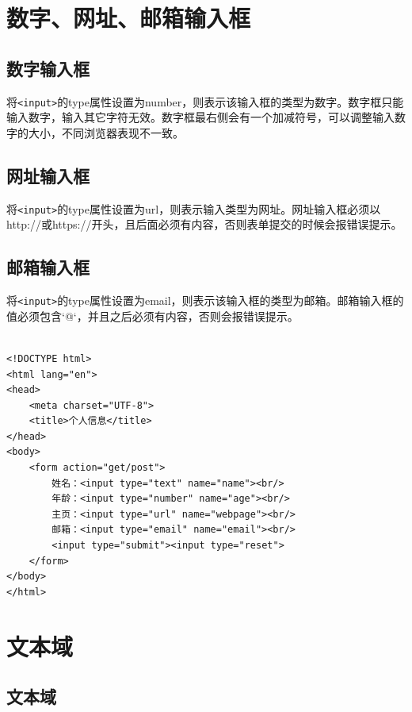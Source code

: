 \newpage

\section{数字、网址、邮箱输入框}

\subsection{数字输入框}

将\lstinline|<input>|的type属性设置为number，则表示该输入框的类型为数字。数字框只能输入数字，输入其它字符无效。数字框最右侧会有一个加减符号，可以调整输入数字的大小，不同浏览器表现不一致。

\subsection{网址输入框}

将\lstinline|<input>|的type属性设置为url，则表示输入类型为网址。网址输入框必须以http://或https://开头，且后面必须有内容，否则表单提交的时候会报错误提示。

\subsection{邮箱输入框}

将\lstinline|<input>|的type属性设置为email，则表示该输入框的类型为邮箱。邮箱输入框的值必须包含`@`，并且之后必须有内容，否则会报错误提示。 \\

 \\
\begin{lstlisting}[style=htmlcssjs]
<!DOCTYPE html>
<html lang="en">
<head>
    <meta charset="UTF-8">
    <title>个人信息</title>
</head>
<body>
    <form action="get/post">
        姓名：<input type="text" name="name"><br/>
        年龄：<input type="number" name="age"><br/>
        主页：<input type="url" name="webpage"><br/>
        邮箱：<input type="email" name="email"><br/>
        <input type="submit"><input type="reset">
    </form>
</body>
</html>
\end{lstlisting}

\newpage

\section{文本域}

\subsection{文本域}


